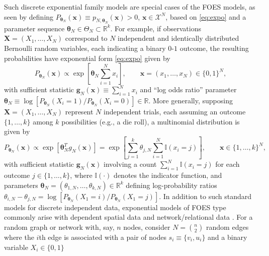 \documentclass[numbib]{imamat}
\theoremstyle{theorem}
\theoremstyle{lemma}
\theoremstyle{example}
\theoremstyle{corollary}
\theoremstyle{definition}
\theoremstyle{remark}
\theoremstyle{approximation}
\theoremstyle{scheme}
\begin{document}
Such discrete exponential family models are special cases of the FOES
models, as seen by defining
\(P_{\boldsymbol \theta_N}(\boldsymbol x)\equiv p_{N,\boldsymbol \theta_N}(\boldsymbol x)> 0\),
\(\boldsymbol x \in \mathcal{X}^N\), based on \eqref{eq:expo} and a
parameter sequence
\(\boldsymbol \theta_N \in \Theta_N \subset \mathbb{R}^k\). For example,
if observations \(\boldsymbol X = (X_1,\ldots,X_N)\) correspond to \(N\)
independent and identically distributed Bernoulli random variables, each
indicating a binary \(0\)-\(1\) outcome, the resulting probabilities
have exponential form \eqref{eq:expo} given by \begin{equation}
\label{eq:mod1}
P_{\boldsymbol \theta_N}(\boldsymbol x) \propto
 \exp\left[\boldsymbol \theta_N \sum_{i=1}^N x_i\right], \qquad \boldsymbol x=(x_1,\ldots,x_N) \in\{0,1\}^N, 
 \end{equation} with sufficient statistic
\(\boldsymbol g_N(\boldsymbol x)\equiv \sum_{i=1}^N x_i\) and ``log odds
ratio'' parameter
\(\boldsymbol \theta_N \equiv \log[ P_{\boldsymbol \theta_N}(X_i=1)/P_{\boldsymbol \theta_N}(X_i=0) ] \in \mathbb{R}\).
More generally, supposing \(\boldsymbol X =(X_1,\ldots,X_N)\) represent
\(N\) independent trials, each assuming an outcome \(\{1,\ldots,k\}\)
among \(k\) possibilities (e.g., a die roll), a multinomial distribution
is given by \begin{equation}
\label{eq:mod11}
P_{\boldsymbol \theta_N}(\boldsymbol x) \propto  \exp\left[  \boldsymbol \theta_{N}^T g_N(\boldsymbol x)   \right] =
\exp\left[ \sum_{j=1}^k {\theta_{j,N}} \sum_{i=1}^N \mathbb{I}(x_i=j) \right], \qquad \boldsymbol x  \in\{1,\ldots,k\}^N, 
\end{equation} with sufficient statistic
\(\boldsymbol g_N(\boldsymbol x)\) involving a count
\(\sum_{i=1}^N \mathbb{I}(x_i=j)\) for each outcome
\(j \in \{1,\ldots,k\}\), where \(\mathbb{I}(\cdot)\) denotes the
indicator function, and parameters
\(\boldsymbol \theta_N=(\theta_{1,N},\ldots,\theta_{k,N})\in\mathbb{R}^k\)
defining log-probability ratios
\(\theta_{i,N}-\theta_{j,N} =\log [P_{\boldsymbol \theta_N}(X_1=i)/P_{\boldsymbol \theta_N}(X_1=j)]\).
In addition to such standard models for discrete independent data,
exponential models of FOES type commonly arise with dependent spatial
data \citep{besag1974spatial} and network/relational data
\citep{wasserman1994social, handcock2003assessing}. For a random graph
or network with, say, \(n\) nodes, consider \(N={n \choose 2}\) random
edges where the \(i\)th edge is associated with a pair of nodes
\(s_i \equiv \{v_i,u_i\}\) and a binary variable \(X_i\in\{0,1\}\)
\end{document}
